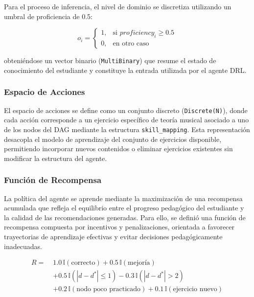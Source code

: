Para el proceso de inferencia, el nivel de dominio se discretiza utilizando un umbral de proficiencia de 0.5:

\begin{equation}
o_i=
\begin{cases}
1, & \text{si } proficiency_i \ge 0.5\\
0, & \text{en otro caso}
\end{cases}
\end{equation}

obteniéndose un vector binario (\texttt{MultiBinary}) que resume el estado de conocimiento del estudiante y constituye la entrada utilizada por el agente DRL.

\subsubsection{Espacio de Acciones}

El espacio de acciones se define como un conjunto discreto (\texttt{Discrete(N)}), donde cada acción corresponde a un ejercicio específico de teoría musical asociado a uno de los nodos del DAG mediante la estructura \texttt{skill\_mapping}. Esta representación desacopla el modelo de aprendizaje del conjunto de ejercicios disponible, permitiendo incorporar nuevos contenidos o eliminar ejercicios existentes sin modificar la estructura del agente.

\subsubsection{Función de Recompensa}

La política del agente se aprende mediante la maximización de una recompensa acumulada que refleja el equilibrio entre el progreso pedagógico del estudiante y la calidad de las recomendaciones generadas. Para ello, se definió una función de recompensa compuesta por incentivos y penalizaciones, orientada a favorecer trayectorias de aprendizaje efectivas y evitar decisiones pedagógicamente inadecuadas.

\begin{equation}
\begin{aligned}
R =\;&
1.0\,\mathbb{I}(\text{correcto})
+0.5\,\mathbb{I}(\text{mejoría}) \\
&+0.5\,\mathbb{I}\!\left(
|d-d^{*}|\le1
\right)
-0.3\,\mathbb{I}\!\left(
|d-d^{*}|>2
\right) \\
&+0.2\,\mathbb{I}(\text{nodo poco practicado})
+0.1\,\mathbb{I}(\text{ejercicio nuevo})
\end{aligned}
\end{equation}

